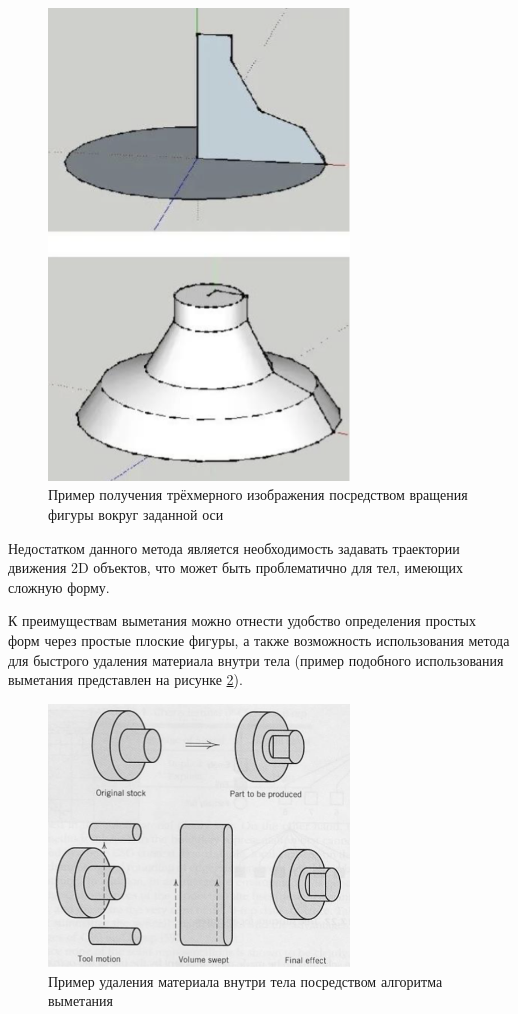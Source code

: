\begin{figure}[h]
	\centering
	\captionsetup{justification=centering}
	\includegraphics[width=80mm]{img/sweeping.png}
	\caption{Пример получения трёхмерного изображения посредством 
		вращения фигуры вокруг заданной оси}
	\label{fig:sweeping}
\end{figure}

Недостатком данного метода является необходимость задавать траектории движения 2D объектов, что может быть проблематично для тел, имеющих сложную форму.

К преимуществам выметания можно отнести удобство определения простых форм через простые плоские фигуры, а также возможность использования метода для быстрого удаления материала внутри тела (пример подобного использования выметания представлен на рисунке \ref{fig:deleting}). 
 
\begin{figure}[h]
	\centering
	\captionsetup{justification=centering}
	\includegraphics[width=80mm]{img/deleting.png}
	\caption{Пример удаления материала внутри тела посредством 
		алгоритма выметания}
	\label{fig:deleting}
\end{figure}


